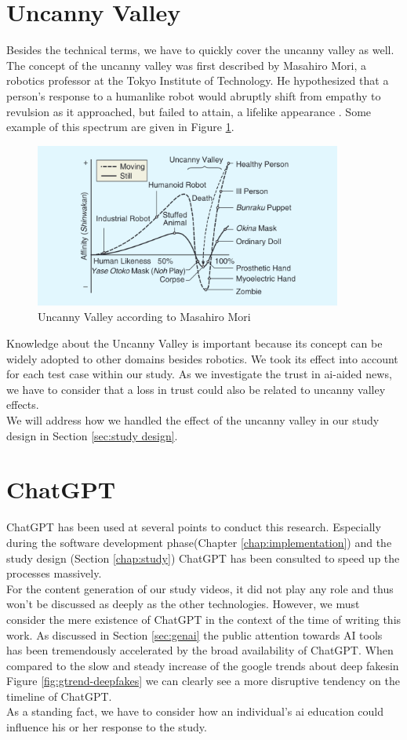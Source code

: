 \documentclass[
  a4paper,  %
  twoside,  %
  bibliography=totoc,
  headsepline,
  cleardoublepage=empty,
  parskip=half,
  draft=false
]{scrbook}
\begin{document}
\section{Uncanny Valley}
Besides the technical terms, we have to quickly cover the uncanny valley as well. The concept of the uncanny valley was first described by Masahiro Mori, a robotics professor at the Tokyo Institute of Technology. He hypothesized that a person's response to a humanlike robot would abruptly shift from empathy to revulsion as it approached, but failed to attain, a lifelike appearance \cite{moriUncannyValleyField2012}. Some example of this spectrum are given in Figure \ref{fig:uncanny-valley}.
\begin{figure}[h]
  \centering
  \includegraphics[width=0.9\textwidth]{./graphics/images/uncanny-valley.png}
  \caption{Uncanny Valley according to Masahiro Mori \cite{moriUncannyValleyField2012}}
  \label{fig:uncanny-valley}
\end{figure}
Knowledge about the Uncanny Valley is important because its concept can be widely adopted to other domains besides robotics. We took its effect into account for each test case within our study. As we investigate the trust in \gls{ai}-aided news, we have to consider that a loss in trust could also be related to uncanny valley effects. \\
We will address how we handled the effect of the uncanny valley in our study design in Section \ref{sec:study design}.
\section{ChatGPT}
ChatGPT has been used at several points to conduct this research. Especially during the software development phase(Chapter \ref{chap:implementation}) and the study design (Section \ref{chap:study}) ChatGPT has been consulted to speed up the processes massively. \\ 
For the content generation of our study videos, it did not play any role and thus won't be discussed as deeply as the other technologies. However, we must consider the mere existence of ChatGPT in the context of the time of writing this work. As discussed in Section \ref{sec:genai} the public attention towards AI tools has been tremendously accelerated by the broad availability of ChatGPT. When compared to the slow and steady increase of the google trends about deep fakesin Figure \ref{fig:gtrend-deepfakes} we can clearly see a more disruptive tendency on the timeline of ChatGPT. \\
As a standing fact, we have to consider how an individual's \gls{ai} education could influence his or her response to the study.
\end{document}
